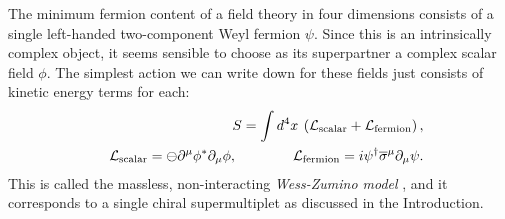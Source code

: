 \documentclass[11pt]{article}
\def\BDpos{}
\def\BDpos{-}
\def\BDpos{\oplus}
\def\BDpos{\ominus}
\def\beq{\begin{eqnarray}}
\def\eeq{\end{eqnarray}}
\def\lagr{{\cal L}}
\def\sigmabar{\overline\sigma}
\begin{document}
The minimum fermion content of a field theory in four dimensions consists
of a single left-handed two-component Weyl fermion $\psi$. Since this is
an intrinsically complex object, it seems sensible to choose as its
superpartner a complex scalar field $\phi$. The simplest action we can
write down for these fields just consists of kinetic energy terms for
each: 
\beq
&&S = \int d^4x\>
\left (\lagr_{\rm scalar} + \lagr_{\rm fermion}\right ) ,
\label{Lwz} \\
&&\lagr_{\rm scalar} = 
  \BDpos \partial^\mu \phi^* \partial_\mu \phi ,
\qquad\qquad
\lagr_{\rm fermion} = 
  i \psi^\dagger \sigmabar^\mu \partial_\mu \psi .
\eeq
This is called the massless, non-interacting {\it Wess-Zumino model}
\cite{WessZumino}, and it corresponds to a single chiral supermultiplet as
discussed in the Introduction. 
\end{document}
